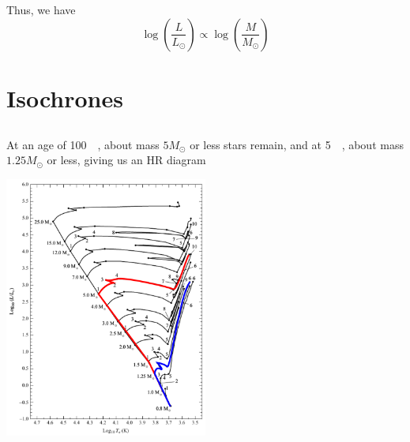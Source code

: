 \documentclass{article}
\begin{document}
\subsection{}

\begin{center}
\end{center}
Thus, we have
\begin{equation}
    \log\left(\frac{L}{L_\odot}\right) \propto \log\left(\frac{M}{M_\odot}\right)
\end{equation}

\newpage
\section{Isochrones}

\subsection{}

At an age of \SI{100}{\mega\year}, about mass \(5 M_\odot\) or less stars remain, and at \SI{5}{\giga\year}, about mass \(1.25 M_\odot\) or less, giving us an HR diagram
\begin{center}
    \includegraphics[width=0.5\textwidth]{q3a.png}
\end{center}
\end{document}
